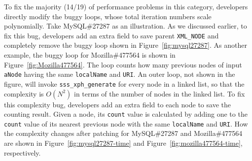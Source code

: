 To fix the majority (14/19) of performance problems in this category,
developers directly modify the buggy loops, 
whose total iteration numbers scale polynomially.
Take MySQL\#27287 as an illustration.
As we discussed earlier, to fix this bug,
developers add an extra field to save parent \texttt{XML\_NODE}
and completely remove the buggy loop shown in Figure~\ref{fig:mysql27287}.
As another example, the buggy loop for Mozilla\#477564 is shown in Figure~\ref{fig:Mozilla477564}.
The loop counts how many previous nodes of input \texttt{aNode} 
having the same \texttt{localName} and \texttt{URI}.
An outer loop, not shown in the figure, 
will invoke \texttt{sss\_xph\_generate} for every node in a linked list, 
so that the complexity is $O(N^2)$ in terms of the number of nodes in the linked list.
To fix this complexity bug, developers add an extra field to each node to 
save the counting result. 
Given a node, 
its \texttt{count} value is calculated by adding one 
to the \texttt{count} value of 
its nearest previous node with the same \texttt{localName} and \texttt{URI}.  
How the complexity changes after patching for MySQL\#27287 and Mozilla\#477564 are 
shown in Figure~\ref{fig:mysql27287-time} and Figure~\ref{fig:mozilla477564-time}, respectively. 









